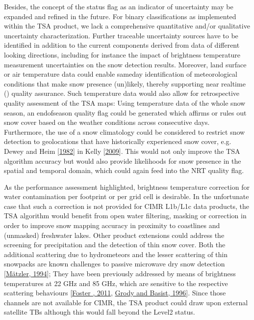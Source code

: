 \documentclass[letterpaper,10pt,english]{jupyterBook}
\begin{document}
\sphinxAtStartPar
Besides, the concept of the status flag as an indicator of uncertainty may be expanded and refined in the future.
For binary classifications as implemented within the TSA product, we lack a comprehensive quantitative and/or qualitative uncertainty characterization.
Further traceable uncertainty sources have to be identified in addition to the current components derived from {\hyperref[\detokenize{book/acronyms:term-TB}]{}} data of different looking directions, including for instance the impact of brightness temperature measurement uncertainties on the snow detection results.
Moreover, land surface or air temperature data could enable same\sphinxhyphen{}day identification of meteorological conditions that make snow presence (un)likely, thereby supporting near real\sphinxhyphen{}time ({\hyperref[\detokenize{book/acronyms:term-NRT}]{}}) quality assurance.
Such temperature data would also allow for retrospective quality assessment of the TSA maps: Using temperature data of the whole snow season, an end\sphinxhyphen{}of\sphinxhyphen{}season quality flag could be generated which affirms or rules out snow cover based on the weather conditions across consecutive days.
Furthermore, the use of a snow climatology could be considered to restrict snow detection to geolocations that have historically experienced snow cover, e.g. Dewey and Heim {[}\hyperlink{cite.book/references:id20}{1982}{]} in Kelly {[}\hyperlink{cite.book/references:id12}{2009}{]}.
This would not only improve the TSA algorithm accuracy but would also provide likelihoods for snow presence in the spatial and temporal domain, which could again feed into the NRT quality flag.

\sphinxAtStartPar
As the performance assessment highlighted, brightness temperature correction for water contamination per footprint or per grid cell is desirable.
In the unfortunate case that such a correction is not provided for CIMR L1b/L1c data products, the TSA algorithm would benefit from open water filtering, masking or correction in order to improve snow mapping accuracy in proximity to coastlines and (unmasked) freshwater lakes.
Other product extensions could address the screening for precipitation and the detection of thin snow cover.
Both the additional scattering due to hydrometeors and the lesser scattering of thin snowpacks are known challenges to passive microwave dry snow detection {[}\hyperlink{cite.book/references:id13}{Mätzler, 1994}{]};
They have been previously addressed by means of brightness temperatures at 22 GHz and 85 GHz, which are sensitive to the respective scattering behaviours {[}\hyperlink{cite.book/references:id21}{Foster , 2011}, \hyperlink{cite.book/references:id9}{Grody and Basist, 1996}{]}.
Since those channels are not available for CIMR, the TSA product could draw upon external satellite TBs although this would fall beyond the Level\sphinxhyphen{}2 status.
\end{document}
